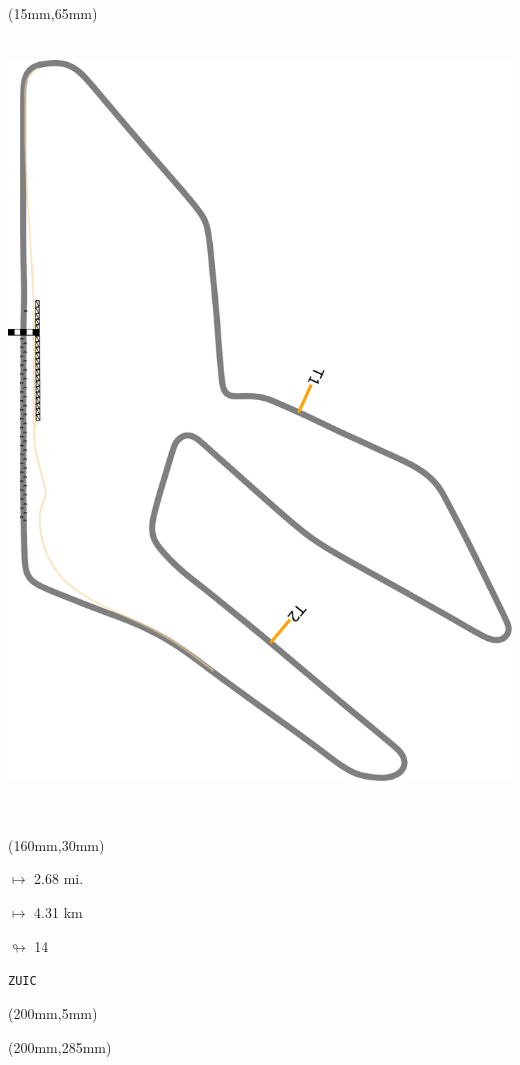 \begin{textblock*}{185mm}(15mm,65mm)%
\centering
\mbox{\includegraphics[width=185mm,height=210mm,keepaspectratio]{PT/ZUIC.pdf}}
\end{textblock*}
\begin{textblock*}{40mm}(160mm,30mm)%
\Large
\par$\mapsto$ 2.68 mi.
\par$\mapsto$ 4.31 km
\par$\looparrowright$ 14
\par\hfill\tiny\tt ZUIC\\
\end{textblock*}
\begin{textblock*}{20mm}(200mm,5mm)%
\fbox{\thepage}
\label{ZUIC}
\end{textblock*}
\begin{textblock*}{20mm}(200mm,285mm)%
\fbox{\thepage}
\end{textblock*}

\null\newpage
